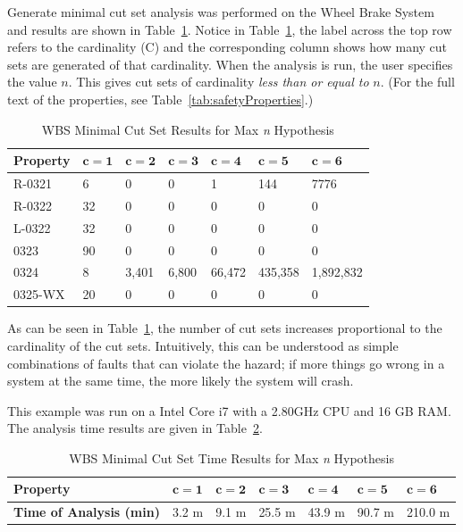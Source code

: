 Generate minimal cut set analysis was performed on the Wheel Brake System and results are shown in Table~\ref{tab:wbs_maxN_results}. Notice in Table~\ref{tab:wbs_maxN_results}, the label across the top row refers to the cardinality (C) and the corresponding column shows how many cut sets are generated of that cardinality. When the analysis is run, the user specifies the value $n$. This gives cut sets of cardinality \textit{less than or equal to} $n$. (For the full text of the properties, see Table~\ref{tab:safetyProperties}.)

\begin{center}
\begin{table}[htbp]
    \begin{tabular}{ | l | l | l | l | l | l | l |}
    \hline
    \textbf{Property} & $\bm{c = 1}$ & $\bm{c = 2}$ & $\bm{c = 3}$ & $\bm{c = 4}$ 
		& $\bm{c = 5}$ & $\bm{c = 6}$   \\ \hline \hline
    R-0321 & 6 & 0 & 0 & 1& 144&7776  \\ \hline
    R-0322 & 32 & 0 & 0 &0 &0 &0 \\ \hline
    L-0322 & 32 & 0 & 0 &0 &0 &0  \\ \hline
    0323 & 90 & 0 & 0 &0 &0 &0 \\ \hline
    0324 & 8 & 3,401 & 6,800 &66,472 & 435,358&1,892,832 \\ \hline
    0325-WX & 20 & 0 & 0 &0 &0 & 0\\ \hline
    \end{tabular}
    \caption{WBS Minimal Cut Set Results for Max \textit{n} Hypothesis}
    \label{tab:wbs_maxN_results}
\end{table}
\end{center}

As can be seen in Table~\ref{tab:wbs_maxN_results}, the number of cut sets increases proportional to the cardinality of the cut sets. Intuitively, this can be understood as simple combinations of faults that can violate the hazard; if more things go wrong in a system at the same time, the more likely the system will crash. 

This example was run on a Intel Core i7 with a 2.80GHz CPU and 16 GB RAM. The analysis time results are given in Table~\ref{tab:analysisTimeWBS}. 

\begin{center}
\begin{table}[htbp]
    \begin{tabular}{ | l | l | l | l | l | l | l |}
    \hline
    \textbf{Property} & $\bm{c = 1}$ & $\bm{c = 2}$ & $\bm{c = 3}$ & $\bm{c = 4}$ 
		& $\bm{c = 5}$ & $\bm{c = 6}$   \\ \hline \hline
    \textbf{Time of Analysis (min)} & 3.2 m & 9.1 m & 25.5 m & 43.9 m & 90.7 m & 210.0 m  \\ \hline
    \end{tabular}
    \caption{WBS Minimal Cut Set Time Results for Max \textit{n} Hypothesis}
    \label{tab:analysisTimeWBS}
\end{table}
\end{center}

